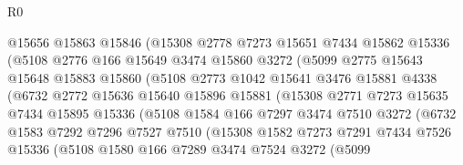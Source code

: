 \begin{lexlean}{R0}
\begin{coremodule}
                    @15656
                    @15863
                    @15846
                    (@15308
                      @2778
                      @7273
                      @15651
                      @7434
                      @15862
                      @15336
                      (@5108
                        @2776
                        @166
                        @15649
                        @3474
                        @15860
                        @3272
                        (@5099
                          @2775
                          @15643
                          @15648
                          @15883
                          @15860
                          (@5108
                            @2773
                            @1042
                            @15641
                            @3476
                            @15881
                            @4338
                            (@6732
                              @2772
                              @15636
                              @15640
                              @15896
                              @15881
                              (@15308
                                @2771
                                @7273
                                @15635
                                @7434
                                @15895
                                @15336
                                (@5108
                                  @1584
                                  @166
                                  @7297
                                  @3474
                                  @7510
                                  @3272
                                  (@6732
                                    @1583
                                    @7292
                                    @7296
                                    @7527
                                    @7510
                                    (@15308
                                      @1582
                                      @7273
                                      @7291
                                      @7434
                                      @7526
                                      @15336
                                      (@5108
                                        @1580
                                        @166
                                        @7289
                                        @3474
                                        @7524
                                        @3272
                                        (@5099

\end{coremodule}
\end{lexlean}
